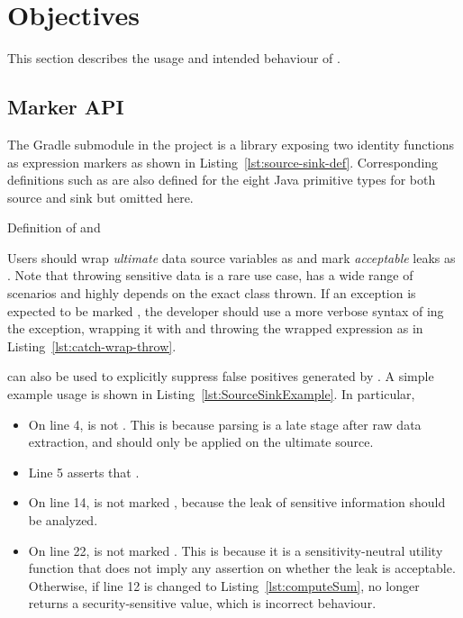 \section{Objectives}\label{sec:objectives}
This section describes the usage and intended behaviour of \pname{}.

\subsection{Marker API}\label{subsec:marker-api}
The  Gradle submodule in the project
is a library exposing two identity functions as expression markers
as shown in Listing~\ref{lst:source-sink-def}.
Corresponding definitions such as 
are also defined for the eight Java primitive types
for both source and sink but omitted here.

{Definition of  and }

Users should wrap \emph{ultimate} data source variables as 
and mark \emph{acceptable} leaks as .
Note that throwing sensitive data is a rare use case,
has a wide range of scenarios
and highly depends on the exact class thrown.
If an exception is expected to be marked ,
the developer should use a more verbose syntax of ing the exception,
wrapping it with  and throwing the wrapped expression
as in Listing~\ref{lst:catch-wrap-throw}.

 can also be used to explicitly suppress false positives generated by \pname{}.
A simple example usage is shown in Listing~\ref{lst:SourceSinkExample}.
In particular,
\begin{itemize}
	\item On line 4,  is not .
		This is because parsing is a late stage after raw data extraction,
		and  should only be applied on the ultimate source.
	\item Line 5 asserts that .
	\item On line 14,  is not marked ,
		because the leak of sensitive information should be analyzed.
	\item On line 22,  is not marked .
		This is because it is a sensitivity-neutral utility function
		that does not imply any assertion on whether the leak is acceptable.
		Otherwise, if line 12 is changed to Listing~\ref{lst:computeSum},
		 no longer returns a security-sensitive value,
		which is incorrect behaviour.
\end{itemize}

